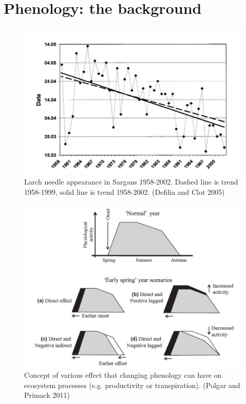 \documentclass[12pt,oneside]{book}
\begin{document}
\section{Phenology: the background}\label{phenology-the-background}

\begin{figure}

{\centering \includegraphics[width=0.8\linewidth]{figures/chap4/f42_Defilia} 

}

\caption{Larch needle appearance in Sargans 1958-2002. Dashed line is trend 1958-1999, solid line is trend 1958-2002.  (Defilia and Clot 2005)}\label{fig:f42}
\end{figure}

\begin{figure}

{\centering \includegraphics[width=0.8\linewidth]{figures/chap4/f43_Polgar} 

}

\caption{Concept of various effect that changing phenology can have on ecosystem processes (e.g. productivity or transpiration). (Polgar and Primack 2011)}\label{fig:f43}
\end{figure}
\end{document}
